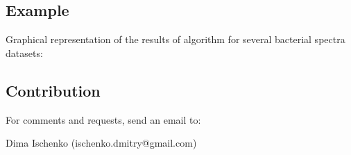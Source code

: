 \documentclass{article}
\begin{document}
\subsection{Example}
Graphical representation of the results of algorithm for several bacterial spectra datasets:
\begin{figure}[H]
 \end{figure} 

\subsection{Contribution}
\par
For comments and requests, send an email to:
\par
Dima Ischenko (ischenko.dmitry@gmail.com)
\end{document}
